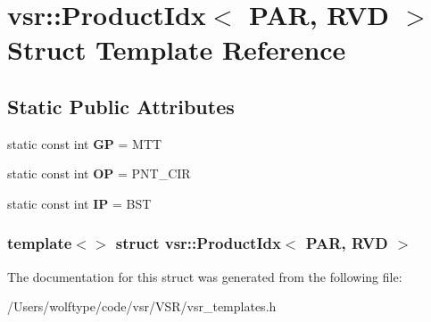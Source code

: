 \hypertarget{structvsr_1_1_product_idx_3_01_p_a_r_00_01_r_v_d_01_4}{\section{vsr\-:\-:Product\-Idx$<$ P\-A\-R, R\-V\-D $>$ Struct Template Reference}
\label{structvsr_1_1_product_idx_3_01_p_a_r_00_01_r_v_d_01_4}
}
\subsection*{Static Public Attributes}
\begin{DoxyCompactItemize}
\item 
\hypertarget{structvsr_1_1_product_idx_3_01_p_a_r_00_01_r_v_d_01_4_a27980473dd92ed6abc58def156da188e}{static const int {\bfseries G\-P} = M\-T\-T}\label{structvsr_1_1_product_idx_3_01_p_a_r_00_01_r_v_d_01_4_a27980473dd92ed6abc58def156da188e}

\item 
\hypertarget{structvsr_1_1_product_idx_3_01_p_a_r_00_01_r_v_d_01_4_ae63de72e424b9008cd73c93d38ad9286}{static const int {\bfseries O\-P} = P\-N\-T\-\_\-\-C\-I\-R}\label{structvsr_1_1_product_idx_3_01_p_a_r_00_01_r_v_d_01_4_ae63de72e424b9008cd73c93d38ad9286}

\item 
\hypertarget{structvsr_1_1_product_idx_3_01_p_a_r_00_01_r_v_d_01_4_a2288d53b8fba4223f9f708e27092ec16}{static const int {\bfseries I\-P} = B\-S\-T}\label{structvsr_1_1_product_idx_3_01_p_a_r_00_01_r_v_d_01_4_a2288d53b8fba4223f9f708e27092ec16}

\end{DoxyCompactItemize}
\subsubsection*{template$<$$>$ struct vsr\-::\-Product\-Idx$<$ P\-A\-R, R\-V\-D $>$}



The documentation for this struct was generated from the following file\-:\begin{DoxyCompactItemize}
\item 
/\-Users/wolftype/code/vsr/\-V\-S\-R/vsr\-\_\-templates.\-h\end{DoxyCompactItemize}
